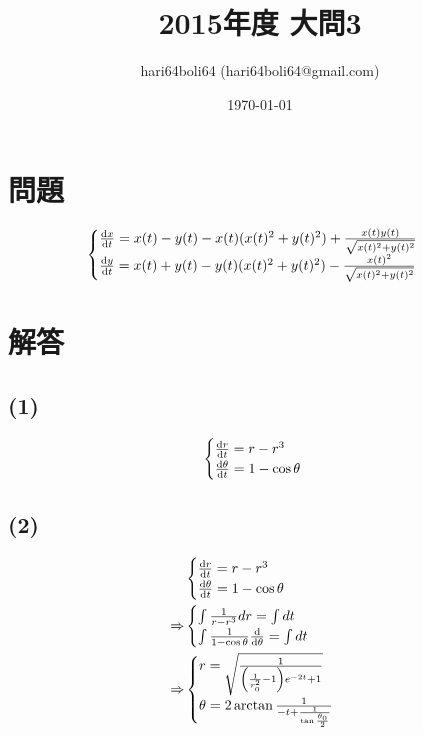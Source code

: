 \documentclass[a4paper, 10pt, dvipdfmx]{jlreq}
\begin{document}
\title{2015年度 大問3}
\author{hari64boli64 (hari64boli64@gmail.com)}
\date{\today}
\maketitle

\section{問題}

\begin{align*}
  \begin{cases}
    \dv{x}{t}=x(t)-y(t)-x(t)(x(t)^2+y(t)^2)+\frac{x(t)y(t)}{\sqrt{x(t)^2+y(t)^2}} \\
    \dv{y}{t}=x(t)+y(t)-y(t)(x(t)^2+y(t)^2)-\frac{x(t)^2}{\sqrt{x(t)^2+y(t)^2}}   \\
  \end{cases}
\end{align*}

\section{解答}

\subsection*{(1)}

\begin{align*}
  \begin{cases}
    \dv{r}{t}=r-r^3 \\
    \dv{\theta}{t}=1-\cos{\theta}
  \end{cases}
\end{align*}

\subsection*{(2)}

\begin{align*}
              & \begin{cases}
    \dv{r}{t}=r-r^3               \\
    \dv{\theta}{t}=1-\cos{\theta} \\
  \end{cases} \\
  \Rightarrow & \begin{cases}
    \int \frac{1}{r-r^3} dr=\int dt                  \\
    \int \frac{1}{1-\cos{\theta}}\dv{\theta}=\int dt \\
  \end{cases} \\
  \Rightarrow & \begin{cases}
    r=\sqrt{\frac{1}{\qty(\frac{1}{r_0^2}-1)e^{-2t}+1}}              \\
    \theta=2\arctan{\frac{1}{-t+\frac{1}{\tan{\frac{\theta_0}{2}}}}} \\
  \end{cases}
\end{align*}
\end{document}
